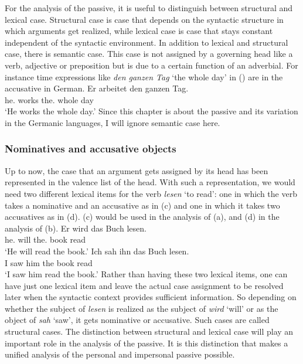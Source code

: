 For the analysis of the passive, it is useful to distinguish between structural and lexical
case. Structural case is case that depends on the syntactic structure in which arguments get
realized, while lexical case is case that stays constant independent of the syntactic environment. In
addition to lexical and structural case, there is semantic case. This case is not assigned by a
governing head like a verb, adjective or preposition but is due to a certain function of an
adverbial. For instance time expressions like \emph{den ganzen Tag} `the whole day' in () are
in the accusative in German.
\ea
\gll Er arbeitet den ganzen Tag.\\
     he.\NOM{} works the.\ACC{} whole day\\\german
\glt `He works the whole day.'
\z
Since this chapter is about the passive and its variation in the Germanic languages, I will ignore
semantic case here.

\subsubsection{Nominatives and accusative objects}

Up to now, the case that an argument gets assigned by its head has been represented in the valence list of
the head. With such a representation, we would need two different lexical items for the verb
\emph{lesen} `to read': one in which the verb takes a nominative and an accusative as in
(c) and one in which it takes two accusatives as in (d). (c) would be used in
the analysis of (a), and (d) in the analysis of (b).
\eal
\ex 
\gll Er wird das Buch lesen.\\
     he.\NOM{} will  the.\ACC{} book read\\\german
\glt `He will read the book.'
\ex 
\gll Ich sah ihn das Buch lesen.\\
     I   saw him the book read\\
\glt `I saw him read the book.'
\ex {}
\ex {}
\zl
Rather than having these two lexical items, one can have just one lexical item and leave the actual
case assignment to be resolved later when the syntactic context provides sufficient information. So
depending on whether the subject of \emph{lesen} is realized as the 
subject of \emph{wird} `will' or as the object of \emph{sah} `saw', it gets nominative or accusative. Such
cases are called structural cases. The distinction between structural and lexical case will play an
important role in the analysis of the passive. It is this distinction that makes a unified analysis of
the personal and impersonal passive possible.

